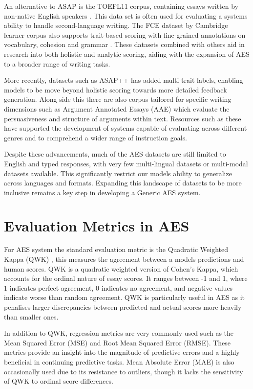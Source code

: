 \documentclass[12pt,a4paper]{report}
\begin{document}
An alternative to ASAP is the TOEFL11 corpus, containing essays written by non-native English speakers \citep{blanchard2013toefl}. This data set is often used for evaluating a systems ability to handle second-language writing. The FCE dataset by Cambridge learner corpus also supports trait-based scoring with fine-grained annotations on vocabulary, cohesion and grammar \citep{Yannakoudakis2011}. These datasets combined with others aid in research into both holistic and analytic scoring, aiding with the expansion of AES to a broader range of writing tasks.

More recently, datasets such as ASAP++ has added multi-trait labels, enabling models to be move beyond holistic scoring towards more detailed feedback generation. Along side this there are also corpus tailored for specific writing dimensions such as Argument Annotated Essays (AAE) which evaluate the persuasiveness and structure of arguments within text. Resources such as these have supported the development of systems capable of evaluating across different genres and to comprehend a wider range of instruction goals.

Despite these advancements, much of the AES datasets are still limited to English and typed responses, with very few multi-lingual datasets or multi-modal datasets available. This significantly restrict our models ability to generalize across languages and formats. Expanding this landscape of datasets to be more inclusive remains a key step in developing a Generic AES system.


\section{Evaluation Metrics in AES}
For AES system the standard evaluation metric is the Quadratic Weighted Kappa (QWK) \citep{cohen1968kappa}, this measures the agreement between a models predictions and human scores. QWK is a quadratic weighted version of Cohen's Kappa, which accounts for the ordinal nature of essay scores. It ranges between -1 and 1, where 1 indicates perfect agreement, 0 indicates no agreement, and negative values indicate worse than random agreement. QWK is particularly useful in AES as it penalises larger discrepancies between predicted and actual scores more heavily than smaller ones.

In addition to QWK, regression metrics are very commonly used such as the Mean Squared Error (MSE) and Root Mean Squared Error (RMSE).  These metrics provide an insight into the magnitude of predictive errors and a highly beneficial in continuing predictive tasks. Mean Absolute Error (MAE) is also occasionally used due to its resistance to outliers, though it lacks the sensitivity of QWK to ordinal score differences.
\end{document}
